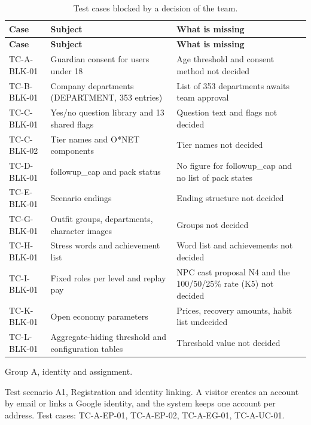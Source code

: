 {\small{}\renewcommand{\arraystretch}{1.1}
\begin{longtable}{|>{\raggedright\arraybackslash}p{}|>{\raggedright\arraybackslash}p{}|>{\raggedright\arraybackslash}p{}|}
\caption{Test cases blocked by a decision of the team.} \\
\hline
\textbf{Case} & \textbf{Subject} & \textbf{What is missing} \\ \hline
\endfirsthead
\hline
\textbf{Case} & \textbf{Subject} & \textbf{What is missing} \\ \hline
\endhead
TC-A-BLK-01 & Guardian consent for users under 18 & Age threshold and consent method not decided \\ \hline
TC-B-BLK-01 & Company departments (DEPARTMENT, 353 entries) & List of 353 departments awaits team approval \\ \hline
TC-C-BLK-01 & Yes/no question library and 13 shared flags & Question text and flags not decided \\ \hline
TC-C-BLK-02 & Tier names and O*NET components & Tier names not decided \\ \hline
TC-D-BLK-01 & followup\_\allowbreak{}cap and pack status & No figure for followup\_\allowbreak{}cap and no list of pack states \\ \hline
TC-E-BLK-01 & Scenario endings & Ending structure not decided \\ \hline
TC-G-BLK-01 & Outfit groups, departments, character images & Groups not decided \\ \hline
TC-H-BLK-01 & Stress words and achievement list & Word list and achievements not decided \\ \hline
TC-I-BLK-01 & Fixed roles per level and replay pay & NPC cast proposal N4 and the 100/50/25\% rate (K5) not decided \\ \hline
TC-K-BLK-01 & Open economy parameters & Prices, recovery amounts, habit list undecided \\ \hline
TC-L-BLK-01 & Aggregate-\allowbreak{}hiding threshold and configuration tables & Threshold value not decided \\ \hline
\end{longtable}
}

Group A, identity and assignment.

Test scenario A1, Registration and identity linking. A visitor creates an account by email or links a Google identity, and the system keeps one account per address. Test cases: TC-A-EP-01, TC-A-EP-02, TC-A-EG-01, TC-A-UC-01.


